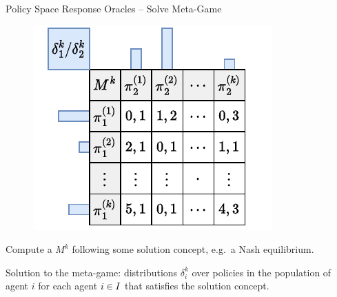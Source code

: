 \begin{frame}[t]{Policy Space Response Oracles -- Solve Meta-Game}
    \vspace{.5em}

    \begin{minipage}{0.39\textwidth}
        \begin{figure}
            \centering
            \includegraphics[width=\textwidth]{images/chapter_9/psro-solve}
        \end{figure}
    \end{minipage}
    \hfill
    \begin{minipage}{0.54\textwidth}
        Compute a  $M^k$ following some solution concept, e.g.\ a Nash equilibrium.\\

        \pause

        Solution to the meta-game: distributions $\delta_i^k$ over policies in the population of agent $i$ for each agent $i\in I$ that satisfies the solution concept.

    \end{minipage}
\end{frame}

